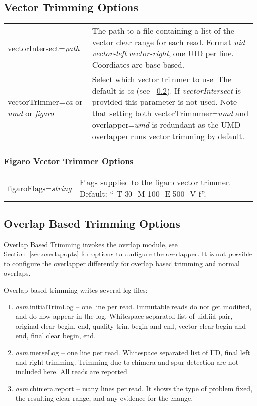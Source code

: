 \documentclass[twoside,11pt]{article}
\begin{document}
\subsection{Vector Trimming Options}
\begin{longtable}{lp{3.0in}}
vectorIntersect={\it path} &
The path to a file containing a list of the vector clear range for
each read.  Format {\it uid vector-left vector-right}, one UID per
line.  Coordiates are base-based.
\\
vectorTrimmer={\em ca} or {\em umd} or {\em figaro} &
Select which vector trimmer to use. The default is {\em ca} (see ~\ref{sec:obtopts}).
If {\em vectorIntersect} is provided this parameter is not used. Note that setting both
vectorTrimmmer={\em umd} and overlapper={\em umd} is redundant as the UMD overlapper
runs vector trimming by default.
\\
\end{longtable}

\subsubsection{Figaro Vector Trimmer Options}

\begin{longtable}{lp{3.0in}}
figaroFlags={\it string} &
Flags supplied to the figaro vector trimmer.  Default: ``-T 30 -M 100 -E 500 -V f''.
\\
\end{longtable}


\subsection{Overlap Based Trimming Options}
\label{sec:obtopts}

Overlap Based Trimming invokes the overlap module, see
Section~\ref{sec:overlapopts} for options to configure the overlapper.
It is not possible to configure the overlapper differently for overlap
based trimming and normal overlaps.

Overlap based trimming writes several log files:

\begin{enumerate}
\item {\it asm}.initialTrimLog -- one line per read.  Immutable reads do not
get modified, and do now appear in the log.  Whitespace separated list
of uid,iid pair, original clear begin, end, quality trim begin and
end, vector clear begin and end, final clear begin, end.

\item {\it asm}.mergeLog -- one line per read.  Whitespace separated list of
IID, final left and right trimming.  Trimming due to chimera and spur
detection are not included here.  All reads are reported.

\item {\it asm}.chimera.report -- many lines per read.  It shows the type of
problem fixed, the resulting clear range, and any evidence for the
change.
\end{enumerate}
\end{document}
